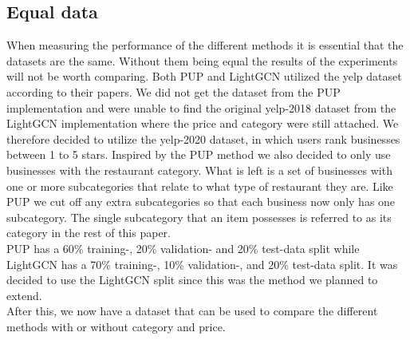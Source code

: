 \subsection{Equal data} \label{equal-data}
When measuring the performance of the different methods it is essential that the datasets are the same.
Without them being equal the results of the experiments will not be worth comparing.
Both PUP and LightGCN utilized the yelp dataset according to their papers.
We did not get the dataset from the PUP implementation and were unable to find the original yelp-2018 dataset from the LightGCN implementation where the price and category were still attached.
We therefore decided to utilize the yelp-2020 dataset, in which users rank businesses between 1 to 5 stars.
Inspired by the PUP method we also decided to only use businesses with the restaurant category.
What is left is a set of businesses with one or more subcategories that relate to what type of restaurant they are.
Like PUP we cut off any extra subcategories so that each business now only has one subcategory.
The single subcategory that an item possesses is referred to as its category in the rest of this paper.
\\
PUP has a 60\% training-, 20\% validation- and 20\% test-data split while LightGCN has a 70\% training-, 10\% validation-, and 20\% test-data split.
It was decided to use the LightGCN split since this was the method we planned to extend.
\\
After this, we now have a dataset that can be used to compare the different methods with or without category and price.
